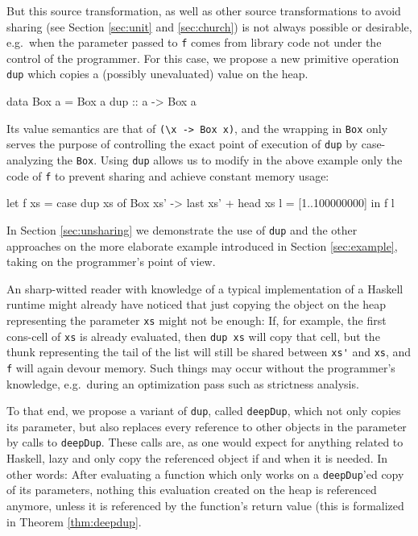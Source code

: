 \documentclass[preprint]{sigplanconf}
\theoremstyle{nonumberplain}
\newcommand{\li}{\lstinline[style=Haskell]}
\begin{document}
But this source transformation, as well as other source transformations to avoid sharing (see Section \ref{sec:unit} and \ref{sec:church}) is not always possible or desirable, e.g.\  when the parameter passed to \li-f- comes from library code not under the control of the programmer. For this case, we propose a new primitive operation \li-dup- which copies a (possibly unevaluated) value on the heap.
\pagebreak[3]
\begin{haskell}
data Box a = Box a
dup :: a -> Box a
\end{haskell}
Its value semantics are that of \li!(\x -> Box x)!, and the wrapping in \li-Box- only serves the purpose of controlling the exact point of execution of \li-dup- by case-analyzing the \li-Box-. Using \li-dup- allows us to modify in the above example only the code of \li-f- to prevent sharing and achieve constant memory usage:
\begin{haskell}
let f xs = case dup xs of
    	Box xs' -> last xs' + head xs
    l = [1..100000000]
in  f l
\end{haskell}
In Section \ref{sec:unsharing} we demonstrate the use of \li-dup- and the other approaches on the more elaborate example introduced in Section \ref{sec:example}, taking on the programmer’s point of view.

An sharp-witted reader with knowledge of a typical implementation of a Haskell runtime might already have noticed that just copying the object on the heap representing the parameter \li-xs- might not be enough: If, for example, the first cons-cell of \li-xs- is already evaluated, then \li-dup xs- will copy that cell, but the thunk representing the tail of the list will still be shared between \li-xs'- and \li-xs-, and \li-f- will again devour memory. Such things may occur without the programmer’s knowledge, e.g.\ during an optimization pass such as strictness analysis.

To that end, we propose a variant of \li-dup-, called \li-deepDup-, which not only copies its parameter, but also replaces every reference to other objects in the parameter by calls to \li-deepDup-. These calls are, as one would expect for anything related to Haskell, lazy and only copy the referenced object if and when it is needed. In other words: After evaluating a function which only works on a \li-deepDup-’ed copy of its parameters, nothing this evaluation created on the heap is referenced anymore, unless it is referenced by the function's return value (this is formalized in Theorem \ref{thm:deepdup}.
\end{document}
